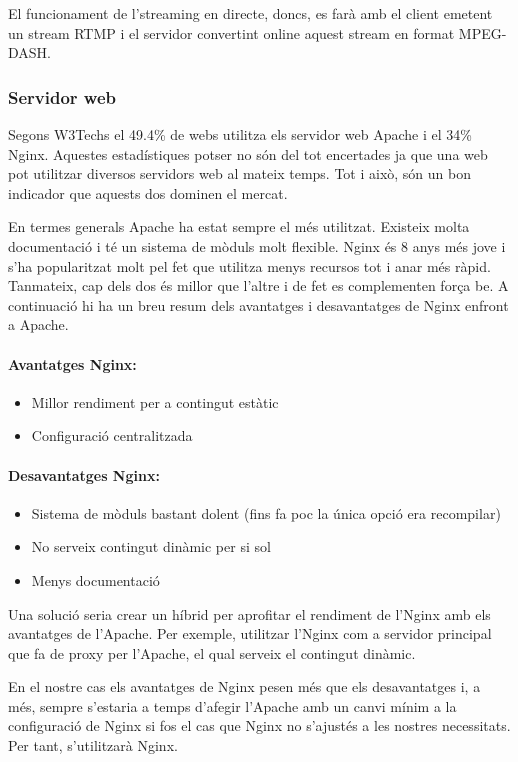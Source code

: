 \documentclass[12pt, titlepage]{article}
\begin{document}
El funcionament de l'streaming en directe, doncs, es farà amb el client emetent un
stream RTMP i el servidor convertint online aquest stream en format MPEG-DASH.


\subsubsection{Servidor web}


Segons W3Techs el 49.4\% de webs utilitza els servidor web Apache i el 34\% Nginx.
Aquestes estadístiques potser no són del tot encertades ja que una web pot utilitzar
diversos servidors web al mateix temps. Tot i això, són un bon indicador que aquests dos
dominen el mercat.

En termes generals Apache ha estat sempre el més utilitzat. Existeix molta
documentació i té un sistema de mòduls molt flexible. Nginx és 8 anys més jove
i s’ha popularitzat molt pel fet que utilitza menys recursos tot i anar més ràpid.
Tanmateix, cap dels dos és millor que l’altre i de fet es complementen força be.
A continuació hi ha un breu resum dels avantatges i desavantatges de Nginx enfront a Apache.

\paragraph{Avantatges Nginx:}
\begin{itemize}
\item Millor rendiment per a contingut estàtic
\item Configuració centralitzada
\end{itemize}
\paragraph{Desavantatges Nginx:}
\begin{itemize}
\item Sistema de mòduls bastant dolent (fins fa poc la única opció era recompilar)
\item No serveix contingut dinàmic per si sol
\item Menys documentació
\end{itemize}

Una solució seria crear un híbrid per aprofitar el rendiment de l’Nginx amb els
avantatges de l’Apache. Per exemple, utilitzar l’Nginx com a servidor principal
que fa de proxy per l’Apache, el qual serveix el contingut dinàmic.

En el nostre cas els avantatges de Nginx pesen més que els desavantatges i, a més,
sempre s’estaria a temps d’afegir l’Apache amb un canvi mínim a la configuració
de Nginx si fos el cas que Nginx no s’ajustés a les nostres necessitats. Per tant,
s’utilitzarà Nginx.
\end{document}

